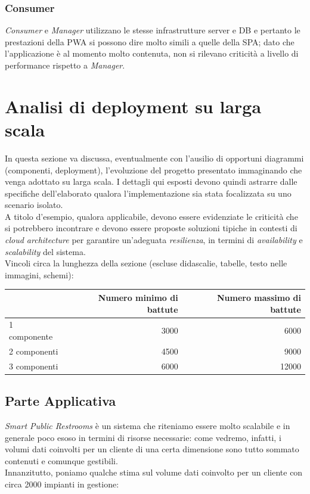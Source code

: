 \documentclass[12pt]{article}
\begin{document}
\subsubsection{Consumer}
\textit{Consumer} e \textit{Manager} utilizzano le stesse infrastrutture server e DB e pertanto le prestazioni della PWA si possono dire molto simili a quelle della SPA; dato che l'applicazione è al momento molto contenuta, non si rilevano criticità a livello di performance rispetto a \textit{Manager}.

\section{Analisi di deployment su larga scala}

In questa sezione va discussa, eventualmente con l'ausilio di opportuni diagrammi (componenti, deployment), l'evoluzione del progetto presentato immaginando che venga adottato su larga scala. I dettagli qui esposti devono quindi astrarre dalle specifiche dell'elaborato qualora l'implementazione sia stata focalizzata su uno scenario isolato.\\

A titolo d’esempio, qualora applicabile, devono essere evidenziate le criticità che si potrebbero incontrare e devono essere proposte soluzioni tipiche in contesti di \textit{cloud architecture} per garantire un'adeguata \textit{resilienza}, in termini di \textit{availability} e \textit{scalability} del sistema.\\


Vincoli circa la lunghezza della sezione (escluse didascalie, tabelle, testo nelle immagini, schemi):

\vspace{1cm}
\begin{tabular}{l|rr}
 & Numero minimo di battute & Numero massimo di battute \\
 \hline
 1 componente & 3000 & 6000 \\
 2 componenti & 4500 & 9000 \\
 3 componenti & 6000 & 12000 \\
 \hline
\end{tabular}


\newpage
\subsection{Parte Applicativa}
\textit{Smart Public Restrooms} è un sistema che riteniamo essere molto scalabile e in generale poco esoso in termini di risorse necessarie: come vedremo, infatti, i volumi dati coinvolti per un cliente di una certa dimensione sono tutto sommato contenuti e comunque gestibili.\\
Innanzitutto, poniamo qualche stima sul volume dati coinvolto per un cliente con circa 2000 impianti in gestione: 
\end{document}
